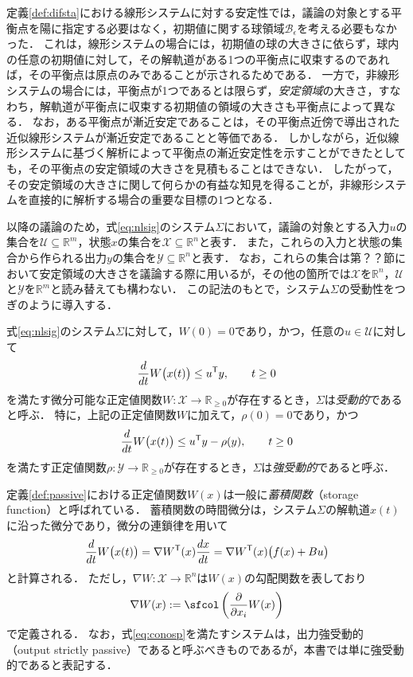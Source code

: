 \documentclass[a4j,10pt,oneside,openany,dvipdfmx]{jsbook}
\begin{document}
定義\ref{def:difsta}における線形システムに対する安定性では，議論の対象とする平衡点を陽に指定する必要はなく，初期値に関する球領域$\mathcal{B}_{\epsilon}$を考える必要もなかった．
これは，線形システムの場合には，初期値の球の大きさに依らず，球内の任意の初期値に対して，その解軌道がある1つの平衡点に収束するのであれば，その平衡点は原点のみであることが示されるためである．
一方で，非線形システムの場合には，平衡点が1つであるとは限らず，\emph{安定領域}の大きさ，すなわち，解軌道が平衡点に収束する初期値の領域の大きさも平衡点によって異なる．
なお，ある平衡点が漸近安定であることは，その平衡点近傍で導出された近似線形システムが漸近安定であることと等価である．
しかしながら，近似線形システムに基づく解析によって平衡点の漸近安定性を示すことができたとしても，その平衡点の安定領域の大きさを見積もることはできない．
したがって，その安定領域の大きさに関して何らかの有益な知見を得ることが，非線形システムを直接的に解析する場合の重要な目標の1つとなる．


以降の議論のため，式\eqref{eq:nlsig}のシステム$\Sigma$において，議論の対象とする入力$u$の集合を$\mathcal{U}\subseteq \mathbb{R}^m$，状態$x$の集合を$\mathcal{X} \subseteq \mathbb{R}^n$と表す．
また，これらの入力と状態の集合から作られる出力$y$の集合を$\mathcal{Y} \subseteq \mathbb{R}^n$と表す．
なお，これらの集合は第？？節において安定領域の大きさを議論する際に用いるが，その他の箇所では$\mathcal{X}$を$\mathbb{R}^n$，$\mathcal{U}$と$\mathcal{Y}$を$\mathbb{R}^m$と読み替えても構わない．
この記法のもとで，システム$\Sigma$の受動性をつぎのように導入する．

\begin{definition}\label{def:passive}
式\eqref{eq:nlsig}のシステム$\Sigma$に対して，$W(0)=0$であり，かつ，任意の$u \in \mathcal{U}$に対して
\begin{equation}\label{eq:conpv}
\frac{d}{dt} W\bigl( x(t) \bigr) \leq u^{\sf T} y
,\qquad
t \geq 0
\end{equation}
を満たす微分可能な正定値関数$W:\mathcal{X} \rightarrow \mathbb{R}_{\geq 0}$が存在するとき，$\Sigma$は\emph{受動的}であると呼ぶ．
特に，上記の正定値関数$W$に加えて，$\rho(0)=0$であり，かつ
\begin{equation}\label{eq:conosp}
\frac{d}{dt} W\bigl( x(t) \bigr) \leq u^{\sf T} y -\rho(y)
,\qquad
t \geq 0
\end{equation}
を満たす正定値関数$\rho:\mathcal{Y} \rightarrow \mathbb{R}_{\geq 0}$が存在するとき，$\Sigma$は\emph{強受動的}であると呼ぶ．
\end{definition}

定義\ref{def:passive}における正定値関数$W(x)$は一般に\emph{蓄積関数}（storage function）と呼ばれている．
蓄積関数の時間微分は，システム$\Sigma$の解軌道$x(t)$に沿った微分であり，微分の連鎖律を用いて
\[
\frac{d}{dt} W\bigl( x(t) \bigr)
= \nabla W^{\sf T} (x) \frac{dx}{dt} = \nabla W^{\sf T} (x) 
\bigl( 
f(x) + Bu
\bigr)
\]
と計算される．
ただし，$\nabla W:\mathcal{X} \rightarrow \mathbb{R}^n$は$W(x)$の勾配関数を表しており
\[
\nabla W(x) := \sfcol \left( 
\frac{\partial }{\partial x_i}W(x)
\right)
\]
で定義される．
なお，式\eqref{eq:conosp}を満たすシステムは，出力強受動的（output strictly passive）であると呼ぶべきものであるが，本書では単に強受動的であると表記する．
\end{document}
